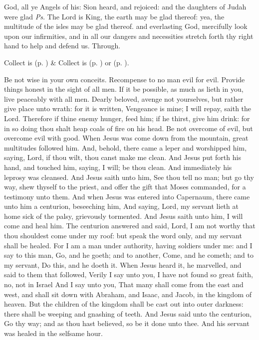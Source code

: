 \introit
{} God, all ye Angels of his: Sion heard, and rejoiced: and the daughters of Judah were glad \textit{Ps.} The Lord is King, the earth may be glad thereof: yea, the multitude of the isles may be glad thereof.
\collect
{} and everlasting God, mercifully look upon our infirmities, and in all our dangers and necessities stretch forth thy right hand to help and defend us. Through.
\begin{rubric}
     Collect is  (p. \pageref{SPMaryPostChristmas}) \&  Collect is  (p. \pageref{SPAgainst}) or  (p. \pageref{SPChiefBishop}).
\end{rubric}
 Be not wise in your own conceits. Recompense to no man evil for evil. Provide things honest in the sight of all men. If it be possible, as much as lieth in you, live peaceably with all men. Dearly beloved, avenge not yourselves, but rather give place unto wrath: for it is written, Vengeance is mine; I will repay, saith the Lord. Therefore if thine enemy hunger, feed him; if he thirst, give him drink: for in so doing thou shalt heap coals of fire on his head. Be not overcome of evil, but overcome evil with good.
 When Jesus was come down from the mountain, great multitudes followed him. And, behold, there came a leper and worshipped him, saying, Lord, if thou wilt, thou canst make me clean. And Jesus put forth his hand, and touched him, saying, I will; be thou clean. And immediately his leprosy was cleansed. And Jesus saith unto him, See thou tell no man; but go thy way, shew thyself to the priest, and offer the gift that Moses commanded, for a testimony unto them. And when Jesus was entered into Capernaum, there came unto him a centurion, beseeching him, And saying, Lord, my servant lieth at home sick of the palsy, grievously tormented. And Jesus saith unto him, I will come and heal him. The centurion answered and said, Lord, I am not worthy that thou shouldest come under my roof: but speak the word only, and my servant shall be healed. For I am a man under authority, having soldiers under me: and I say to this man, Go, and he goeth; and to another, Come, and he cometh; and to my servant, Do this, and he doeth it. When Jesus heard it, he marvelled, and said to them that followed, Verily I say unto you, I have not found so great faith, no, not in Israel And I say unto you, That many shall come from the east and west, and shall sit down with Abraham, and Isaac, and Jacob, in the kingdom of heaven. But the children of the kingdom shall be cast out into outer darkness: there shall be weeping and gnashing of teeth. And Jesus said unto the centurion, Go thy way; and as thou hast believed, so be it done unto thee. And his servant was healed in the selfsame hour.

